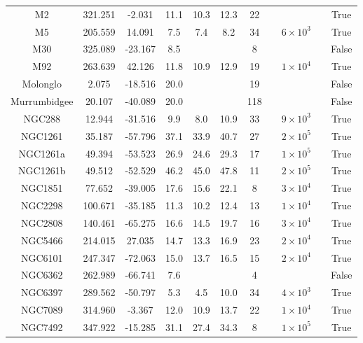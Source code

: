 \begin{table}
\begin{tabular}{ccccccccccc}
M2 & 321.251 & -2.031 & 11.1 & 10.3 & 12.3 & 22 & \citet{ibata:2021} & &  & True \\
M5 & 205.559 & 14.091 & 7.5 & 7.4 & 8.2 & 34 & \citet{ibata:2023} & $6 \times 10^{3}$ &  & True \\
M30 & 325.089 & -23.167 & 8.5 & & & 8 & \citet{sollima:2020} & &  & False \\
M92 & 263.639 & 42.126 & 11.8 & 10.9 & 12.9 & 19 & \citet{ibata:2023} & $1 \times 10^{4}$ &  & True \\
Molonglo & 2.075 & -18.516 & 20.0 & & & 19 & \citet{grillmair:2017b} & &  & False \\
Murrumbidgee & 20.107 & -40.089 & 20.0 & & & 118 & \citet{grillmair:2017b} & &  & False \\
NGC288 & 12.944 & -31.516 & 9.9 & 8.0 & 10.9 & 33 & \citet{ibata:2023} & $9 \times 10^{3}$ &  & True \\
NGC1261 & 35.187 & -57.796 & 37.1 & 33.9 & 40.7 & 27 & \citet{ibata:2023} & $2 \times 10^{5}$ &  & True \\
NGC1261a & 49.394 & -53.523 & 26.9 & 24.6 & 29.3 & 17 & \citet{ibata:2023} & $1 \times 10^{5}$ &  & True \\
NGC1261b & 49.512 & -52.529 & 46.2 & 45.0 & 47.8 & 11 & \citet{ibata:2023} & $2 \times 10^{5}$ &  & True \\
NGC1851 & 77.652 & -39.005 & 17.6 & 15.6 & 22.1 & 8 & \citet{ibata:2023} & $3 \times 10^{4}$ &  & True \\
NGC2298 & 100.671 & -35.185 & 11.3 & 10.2 & 12.4 & 13 & \citet{ibata:2023} & $1 \times 10^{4}$ &  & True \\
NGC2808 & 140.461 & -65.275 & 16.6 & 14.5 & 19.7 & 16 & \citet{ibata:2023} & $3 \times 10^{4}$ &  & True \\
NGC5466 & 214.015 & 27.035 & 14.7 & 13.3 & 16.9 & 23 & \citet{ibata:2023} & $2 \times 10^{4}$ &  & True \\
NGC6101 & 247.347 & -72.063 & 15.0 & 13.7 & 16.5 & 15 & \citet{ibata:2023} & $2 \times 10^{4}$ &  & True \\
NGC6362 & 262.989 & -66.741 & 7.6 & & & 4 & \citet{sollima:2020} & &  & False \\
NGC6397 & 289.562 & -50.797 & 5.3 & 4.5 & 10.0 & 34 & \citet{ibata:2023} & $4 \times 10^{3}$ &  & True \\
NGC7089 & 314.960 & -3.367 & 12.0 & 10.9 & 13.7 & 22 & \citet{ibata:2023} & $1 \times 10^{4}$ &  & True \\
NGC7492 & 347.922 & -15.285 & 31.1 & 27.4 & 34.3 & 8 & \citet{ibata:2023} & $1 \times 10^{5}$ &  & True \\

\end{tabular}
\end{table}
